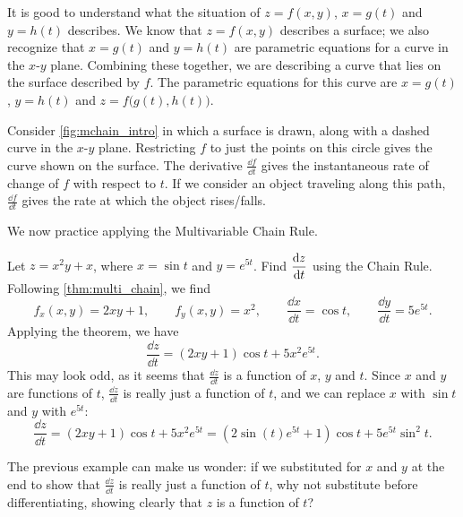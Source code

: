 It is good to understand what the situation of $z=f(x,y)$, $x=g(t)$ and $y=h(t)$ describes. We know that $z=f(x,y)$ describes a surface; we also recognize that $x=g(t)$ and $y=h(t)$ are parametric equations for a curve in the $x$-$y$ plane. Combining these together, we are describing a curve that lies on the surface described by $f$. The parametric equations for this curve are $x=g(t)$, $y=h(t)$ and $z=f\bigl(g(t),h(t)\bigr)$.


Consider \autoref{fig:mchain_intro} in which a surface is drawn, along with a dashed curve in the $x$-$y$ plane. Restricting $f$ to just the points on this circle gives the curve shown on the surface. The derivative $\frac{\dd f}{\dd t}$ gives the instantaneous rate of change of $f$ with respect to $t$. If we consider an object traveling along this path, $\frac{\dd f}{\dd t}$ gives the rate at which the object rises/falls.

We now practice applying the Multivariable Chain Rule.

\begin{example}\label{ex_mchain1}%
Let $z=x^2y+x$, where $x=\sin t$ and $y=e^{5t}$. Find $\displaystyle \frac{\operatorname{d}\! z}{\operatorname{d}\! t}$ using the Chain Rule.
\solution
Following \autoref{thm:multi_chain}, we find
\[f_x(x,y) = 2xy+1,\qquad f_y(x,y) = x^2,\qquad \frac{\dd x}{\dd t} = \cos t,\qquad \frac{\dd y}{\dd t}= 5e^{5t}.\]
Applying the theorem, we have
\[\frac{\dd z}{\dd t} = (2xy+1)\cos t+ 5x^2e^{5t}.\]
This may look odd, as it seems that $\frac{\dd z}{\dd t}$ is a function of $x$, $y$ and $t$. Since $x$ and $y$ are functions of $t$, $\frac{\dd z}{\dd t}$ is really just a function of $t$, and we can replace $x$ with $\sin t$ and $y$ with $e^{5t}$:
\[\frac{\dd z}{\dd t} = (2xy+1)\cos t+ 5x^2e^{5t} = (2\sin (t)e^{5t}+1)\cos t+5e^{5t}\sin^2t.\]
\end{example}

The previous example can make us wonder: if we substituted for $x$ and $y$ at the end to show that $\frac{\dd z}{\dd t}$ is really just a function of $t$, why not substitute before differentiating, showing clearly that $z$ is a function of $t$?

